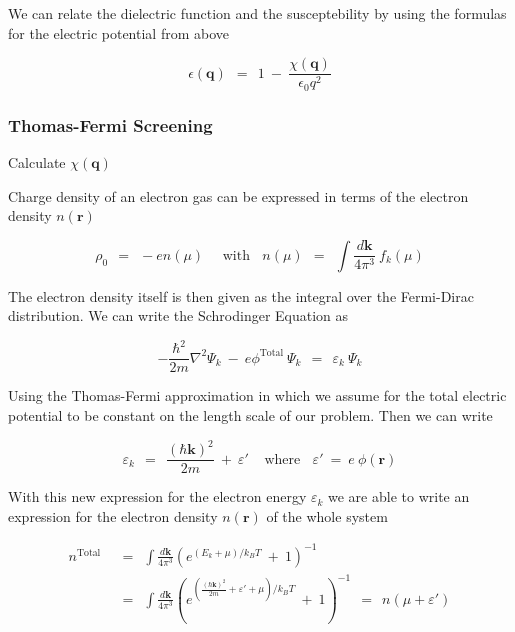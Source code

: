 \documentclass[10pt]{report}
\numberwithin{equation}{chapter}
\begin{document}
We can relate the dielectric function and the susceptebility  by using the formulas for the electric potential from above

\begin{equation}
  \epsilon(\mathbf{q}) ~~=~~ 1 ~-~ \frac{\chi(\mathbf{q})}{\epsilon_0 q^2}
\end{equation}


\subsubsection{Thomas-Fermi Screening}

Calculate $\chi(\mathbf{q})$


Charge density of an electron gas can be expressed in terms of the electron density $n(\mathbf{r})$

\begin{equation}
  \rho_0 ~~=~~ -e n(\mu) ~~~~~~\text{with}~~~~ 
  n(\mu) ~~=~~ \int \frac{d \mathbf{k}}{4\pi^3}\ f_k(\mu)
\end{equation}

The electron density itself is then given as the integral over the Fermi-Dirac distribution. We can write the Schrodinger Equation as 

\begin{equation} \label{eq:screen_hamiltonian}
  -\frac{\hbar^2}{2m} \nabla^2 \Psi_k ~-~ e\phi^\text{Total}\ \Psi_k ~~=~~ \varepsilon_k\ \Psi_k
\end{equation}

Using the Thomas-Fermi approximation in which we assume for the total electric potential to be constant on the length scale of our problem. Then we can write

\begin{equation}
  \varepsilon_k ~~=~~ \frac{(\hbar \mathbf{k})^2}{2m} ~+~ \varepsilon' ~~~~~\text{where}~~~~
  \varepsilon' ~=~ e\ \phi(\mathbf{r})
\end{equation}

With this new expression for the electron energy $\varepsilon_k$ we are able to write an expression for the electron density $n(\mathbf{r})$ of the whole system

\begin{align}
  n^\text{Total} ~~& =~~ \int \frac{d \mathbf{k}}{4\pi^3} \left(e^{(E_k + \mu)/k_BT} ~+~ 1 \right)^{-1} \nonumber \\
  ~~& =~~ \int \frac{d \mathbf{k}}{4\pi^3} \left(e^{(\frac{(\hbar \mathbf{k})^2}{2m} + \varepsilon' + \mu)/k_BT} ~+~ 1 \right)^{-1} 
  ~~=~~ n(\mu + \varepsilon')
\end{align}
\end{document}
